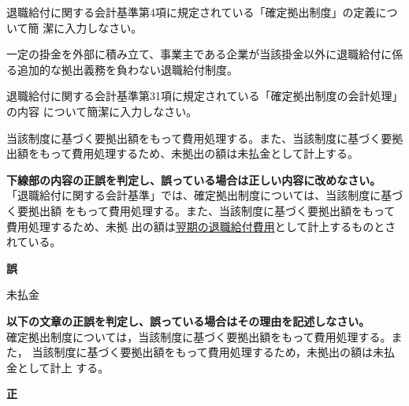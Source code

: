 
\begin{shortanswer}[年金2 \ 2022 \ 問題2(6)ア]
  退職給付に関する会計基準第4項に規定されている「確定拠出制度」の定義について簡
潔に入力しなさい。
\end{shortanswer}

\begin{answerbox}
  一定の掛金を外部に積み立て、事業主である企業が当該掛金以外に退職給付に係る追加的な拠出義務を負わない退職給付制度。
\end{answerbox}


\begin{shortanswer}[年金2 \ 2022 \ 問題2(6)イ]
  退職給付に関する会計基準第31項に規定されている「確定拠出制度の会計処理」の内容
について簡潔に入力しなさい。
\end{shortanswer}

\begin{answerbox}
当該制度に基づく要拠出額をもって費用処理する。また、当該制度に基づく要拠出額をもって費用処理するため、未拠出の額は未払金として計上する。
\end{answerbox}

\begin{truefalse}[年金2 \ 2018 \ 問題1(1)\textcircled{2}]
\textbf{下線部の内容の正誤を判定し、誤っている場合は正しい内容に改めなさい。}
\\

「退職給付に関する会計基準」では、確定拠出制度については、当該制度に基づく要拠出額
をもって費用処理する。また、当該制度に基づく要拠出額をもって費用処理するため、未拠
出の額は\underline{翌期の退職給付費用}として計上するものとされている。
\end{truefalse}

\begin{answerbox}
  \textbf{誤}

  未払金
\end{answerbox}

\begin{truefalse}
\textbf{以下の文章の正誤を判定し、誤っている場合はその理由を記述しなさい。}
\\

確定拠出制度については，当該制度に基づく要拠出額をもって費用処理する。また，
 当該制度に基づく要拠出額をもって費用処理するため，未拠出の額は未払金として計上
 する。
\end{truefalse}


\begin{answerbox}
  \textbf{正}
\end{answerbox}